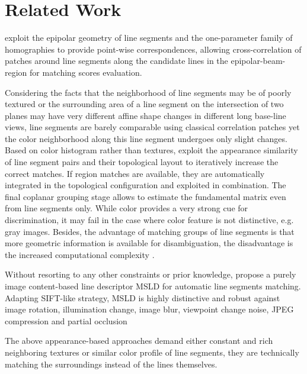 \section{Related Work}

\citeauthor{SchmidJun1997} exploit the epipolar geometry of line segments and the one-parameter family of homographies to provide point-wise correspondences, allowing cross-correlation of patches around line segments along the candidate lines in the epipolar-beam-region for matching scores evaluation.

Considering the facts that the neighborhood of line segments may be of poorly textured or the surrounding area of a line segment on the intersection of two planes may have very different affine shape changes in different long base-line views, line segments are barely comparable using classical correlation patches yet the color neighborhood along this line segment undergoes only slight changes. %
Based on color histogram rather than textures, \citeauthor{BayJun2005} exploit the appearance similarity of line segment pairs and their topological layout to iteratively increase the correct matches. If region matches are available, they are automatically integrated in the topological configuration and exploited in combination. The final coplanar grouping stage allows to estimate the fundamental matrix even from line segments only. While color provides a very strong cue for discrimination, it may fail in the case where color feature is not distinctive, e.g. gray images. Besides, the advantage of matching groups of line segments is that more geometric information is available for disambiguation, the disadvantage is the increased computational complexity \cite{SchmidJun1997}.


Without resorting to any other constraints or prior knowledge, \citeauthor{WangMay2009} propose a purely image content-based line descriptor MSLD for automatic line segments matching. Adapting SIFT-like strategy, MSLD is highly distinctive and robust against image rotation, illumination change, image blur, viewpoint change noise, JPEG compression and partial occlusion \cite{WangMay2009}

The above appearance-based approaches demand either constant and rich neighboring textures or similar color profile of line segments, they are technically matching the surroundings instead of the lines themselves.

